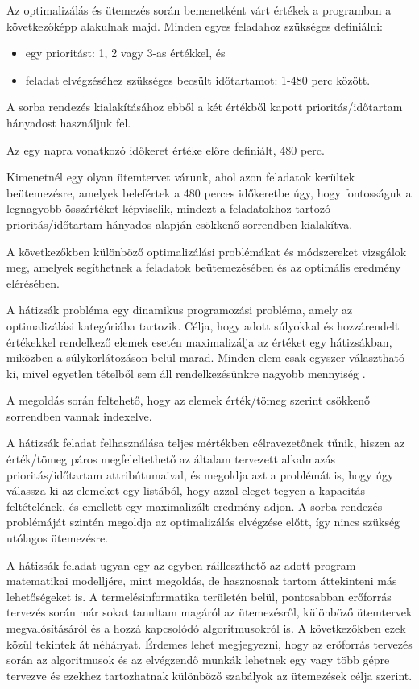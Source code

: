 Az optimalizálás és ütemezés során bemenetként várt értékek a programban a következőképp alakulnak majd.
Minden egyes feladahoz szükséges definiálni:
\begin{itemize}
\item egy prioritást: 1, 2 vagy 3-as értékkel, és
\item feladat elvégzéséhez szükséges becsült időtartamot: 1-480 perc között.
\end{itemize}
A sorba rendezés kialakításához ebből a két értékből kapott prioritás/időtartam hányadost használjuk fel.

Az egy napra vonatkozó időkeret értéke előre definiált, 480 perc.

Kimenetnél egy olyan ütemtervet várunk, ahol azon feladatok kerültek beütemezésre, amelyek belefértek a 480 perces időkeretbe úgy, hogy fontosságuk a legnagyobb összértéket képviselik, mindezt a feladatokhoz tartozó prioritás/időtartam hányados alapján csökkenő sorrendben kialakítva.

A következőkben különböző optimalizálási problémákat és módszereket vizsgálok meg, amelyek segíthetnek a feladatok beütemezésében és az optimális eredmény elérésében.


A hátizsák probléma egy dinamikus programozási probléma, amely az optimalizálási kategóriába tartozik. Célja, hogy adott súlyokkal és hozzárendelt értékekkel rendelkező elemek esetén maximalizálja az értéket egy hátizsákban, miközben a súlykorlátozáson belül marad. Minden elem csak egyszer választható ki, mivel egyetlen tételből sem áll rendelkezésünkre nagyobb mennyiség \cite{knapsack}.

A megoldás során feltehető, hogy az elemek érték/tömeg szerint csökkenő sorrendben vannak indexelve.

A hátizsák feladat felhasználása teljes mértékben célravezetőnek tűnik, hiszen az érték/tömeg páros megfeleltethető az általam tervezett alkalmazás prioritás/időtartam attribútumaival, és megoldja azt a problémát is, hogy úgy válassza ki az elemeket egy listából, hogy azzal eleget tegyen a kapacitás feltételének, és emellett egy maximalizált eredmény adjon. A sorba rendezés problémáját szintén megoldja az optimalizálás elvégzése előtt, így nincs szükség utólagos ütemezésre.


A hátizsák feladat ugyan egy az egyben ráilleszthető az adott program matematikai modelljére, mint megoldás, de hasznosnak tartom áttekinteni más lehetőségeket is. A termelésinformatika területén belül, pontosabban erőforrás tervezés során már sokat tanultam magáról az ütemezésről, különböző ütemtervek megvalósításáról és a hozzá kapcsolódó algoritmusokról is. A következőkben ezek közül tekintek át néhányat. Érdemes lehet megjegyezni, hogy az erőforrás tervezés során az algoritmusok és az elvégzendő munkák lehetnek egy vagy több gépre tervezve és ezekhez tartozhatnak különböző szabályok az ütemezések célja szerint.

